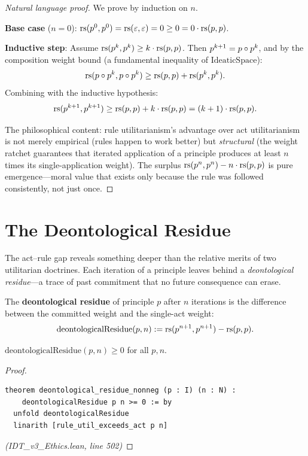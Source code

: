 \begin{proof}[Natural language proof]
We prove by induction on $n$.

\textbf{Base case} ($n = 0$): $\mathrm{rs}(p^0, p^0) = \mathrm{rs}(\varepsilon, \varepsilon) = 0 \geq
0 = 0 \cdot \mathrm{rs}(p,p)$.

\textbf{Inductive step}: Assume $\mathrm{rs}(p^k, p^k) \geq k \cdot \mathrm{rs}(p,p)$.
Then $p^{k+1} = p \circ p^k$, and by the composition weight bound
(a fundamental inequality of $\mathrm{IdeaticSpace}$):
\[
  \mathrm{rs}(p \circ p^k, p \circ p^k) \geq \mathrm{rs}(p, p) + \mathrm{rs}(p^k, p^k).
\]
Combining with the inductive hypothesis:
\[
  \mathrm{rs}(p^{k+1}, p^{k+1}) \geq \mathrm{rs}(p,p) + k \cdot \mathrm{rs}(p,p) = (k+1) \cdot \mathrm{rs}(p,p).
\]

The philosophical content: rule utilitarianism's advantage over act
utilitarianism is not merely empirical (rules happen to work better)
but \emph{structural} (the weight ratchet guarantees that iterated
application of a principle produces at least $n$ times its
single-application weight). The surplus $\mathrm{rs}(p^n, p^n) - n \cdot \mathrm{rs}(p,p)$
is pure emergence---moral value that exists only because the rule was
followed consistently, not just once.
\end{proof}

\section{The Deontological Residue}
\label{sec:deontological-residue}

The act--rule gap reveals something deeper than the relative merits of
two utilitarian doctrines. Each iteration of a principle leaves behind a
\emph{deontological residue}---a trace of past commitment that no future
consequence can erase.

\begin{definition}
\label{def:deontological-residue}
The \textbf{deontological residue} of principle $p$ after $n$ iterations
is the difference between the committed weight and the single-act weight:
\[
  \mathrm{deontologicalResidue}(p, n) := \mathrm{rs}(p^{n+1}, p^{n+1}) - \mathrm{rs}(p, p).
\]
\end{definition}

\begin{theorem}
\label{thm:residue-nonneg}
$\mathrm{deontologicalResidue}(p, n) \geq 0$ for all $p, n$.
\end{theorem}

\begin{proof}
\begin{lstlisting}
theorem deontological_residue_nonneg (p : I) (n : N) :
    deontologicalResidue p n >= 0 := by
  unfold deontologicalResidue
  linarith [rule_util_exceeds_act p n]
\end{lstlisting}
\textit{(IDT\_v3\_Ethics.lean, line 502)}
\end{proof}

